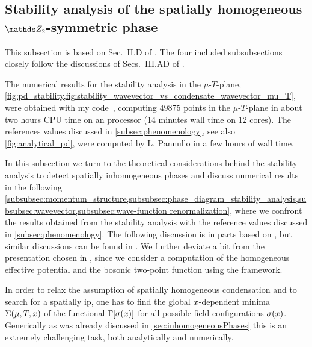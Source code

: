 \subsection{Stability analysis of the spatially homogeneous \texorpdfstring{$\Z_2$}{Z2}-symmetric phase}\label{subsec:stability} 
\begin{disclaimer}
	This subsection is based on Sec.~II.D of .
	The four included subsubsections closely follow the discussions of Secs.~III.A\dash{}D of .
	
	The numerical results for the stability analysis in the $\mu$-$T$-plane, \cf{} \cref{fig:pd_stability,fig:stability_wavevector_vs_condensate_wavevector_mu_T}, were obtained with my \Cpp{} code~\cite{Steil:2023GNcpp}, computing 49875 points in the $\mu$-$T$-plane in about two hours CPU time on an \ryzen{} processor (14 minutes wall time on 12 cores).
	The references values discussed in \cref{subsec:phenomenology}, see also \cref{fig:analytical_pd}, were computed by L. Pannullo in a few hours of wall time.	
\end{disclaimer}

In this subsection we turn to the theoretical considerations behind the stability analysis to detect spatially inhomogeneous phases and discuss numerical results in the following \cref{subsubsec:momentum_structure,subsubsec:phase_diagram_stability_analysis,subsubsec:wavevector,subsubsec:wave-function renormalization}, where we confront the results obtained from the stability analysis with the reference values discussed in \cref{subsec:phenomenology}.
The following discussion is in parts based on , but similar discussions can be found in .
We further deviate a bit from the presentation chosen in , since we consider a computation of the homogeneous effective potential and the bosonic two-point function using the \frg{} framework.\bigskip

In order to relax the assumption of spatially homogeneous condensation and to search for a spatially \gls{ip}, one has to find the global $x$-dependent minima $\Sigma ( \mu, T, x )$ of the functional $\Gamma [ \sigma ( x ) ]$ for all possible field configurations $\sigma ( x )$.
Generically \dash{} as was already discussed in \cref{sec:inhomogeneousPhases} \dash{} this is an extremely challenging task, both analytically and numerically.

